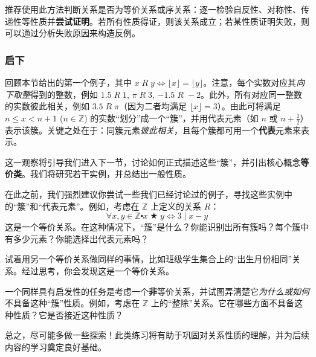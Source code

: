 推荐使用此方法判断关系是否为等价关系或序关系：逐一检验自反性、对称性、传递性等性质并\textbf{尝试证明}。若所有性质得证，则该关系成立；若某性质证明失败，则可以通过分析失败原因来构造反例。

\subsubsection*{启下}

回顾本节给出的第一个例子，其中 $x \;R\; y \iff \lfloor x \rfloor = \lfloor y \rfloor$。注意，每个实数对应其\emph{向下取整}得到的整数，例如 $1.5 \;R\; 1$, $\pi \;R\; 3$, $-1.5 \;R\; -2$。此外，所有对应同一整数的实数彼此相关，例如 $3.5 \;R\; \pi$（因为二者均满足 $\lfloor x \rfloor=3$）。由此可将满足 $n \le x < n+1$ ($n \in \mathbb{Z}$) 的实数``划分''成一个``簇''，并用代表元素（如 $n$ 或 $n+\frac{1}{2}$）表示该簇。关键之处在于：同簇元素\emph{彼此相关}，且每个簇都可用一个\textbf{代表}元素来表示。

这一观察将引导我们进入下一节，讨论如何正式描述这些``簇''，并引出核心概念\textbf{等价类}。我们将研究若干实例，并总结出一般性质。

在此之前，我们强烈建议你尝试一些我们已经讨论过的例子，寻找这些实例中的``簇''和``代表元素''。例如，考虑在 $\mathbb{Z}$ 上定义的关系 $R$：
\[\forall x, y \in \mathbb{Z} \centerdot x \;\bigstar\; y \iff 3 \mid x - y\]
这是一个等价关系。在这种情况下，``簇''是什么？你能识别出所有簇吗？每个簇中有多少元素？你能选择出代表元素吗？

试着用另一个等价关系做同样的事情，比如班级学生集合上的``出生月份相同''关系。经过思考，你会发现这是一个等价关系。

一个同样具有启发性的任务是考虑一个\textbf{非}等价关系，并试图弄清楚它\emph{为什么或如何}不具备这种``簇''性质。例如，考虑在 $\mathbb{Z}$ 上的``整除''关系。它在哪些方面不具备这种性质？它是否接近这种性质？

总之，尽可能多做一些探索！此类练习将有助于巩固对关系性质的理解，并为后续内容的学习奠定良好基础。
